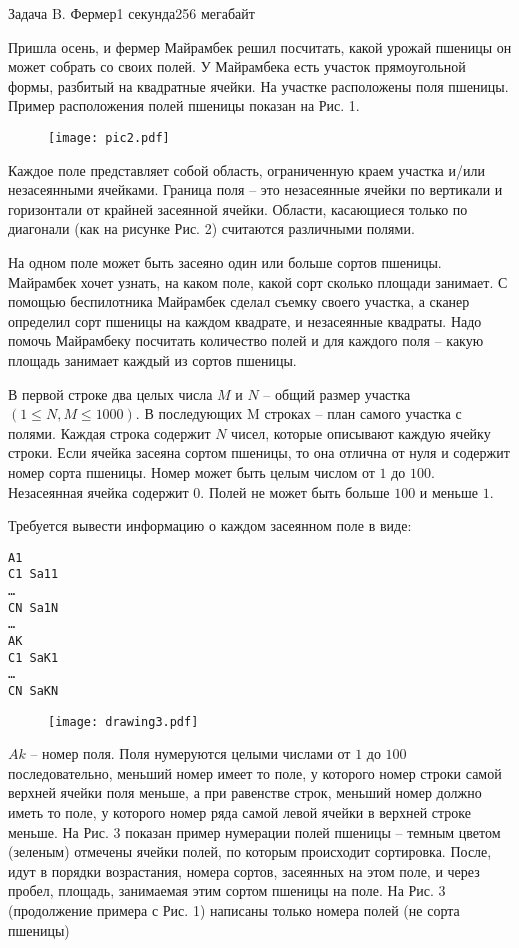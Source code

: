 \documentclass[11pt,a4paper,oneside]{article}
\begin{document}
\begin{problem}{Задача B. Фермер}{1 секунда}{256 мегабайт}

Пришла осень, и фермер Майрамбек решил посчитать, какой урожай пшеницы он может собрать со своих полей. У Майрамбека есть участок прямоугольной формы, разбитый на квадратные ячейки. На участке расположены  поля пшеницы. Пример расположения полей пшеницы показан на Рис. 1. 


\begin{figure}[ht]
\centering
\texttt{[image: pic2.pdf]}
\end{figure}


Каждое поле представляет собой область, ограниченную краем участка и/или незасеянными ячейками. Граница поля – это незасеянные ячейки по вертикали и  горизонтали от крайней засеянной ячейки. Области, касающиеся только по диагонали (как на рисунке Рис. 2) считаются различными полями.  


На одном поле может быть  засеяно один или больше сортов пшеницы. Майрамбек хочет узнать, на каком поле, какой сорт сколько площади занимает. С помощью беспилотника Майрамбек сделал съемку своего участка, а сканер определил сорт пшеницы на каждом квадрате, и незасеянные квадраты.  Надо помочь Майрамбеку посчитать количество полей и для каждого поля – какую площадь занимает каждый из сортов пшеницы.

\InputFile
В первой строке два целых числа $M$ и $N$ – общий размер участка $(1 \leq N,M \leq 1000)$. В последующих M строках – план самого участка с полями. Каждая строка содержит $N$ чисел, которые описывают каждую ячейку строки. Если ячейка засеяна сортом пшеницы, то она отлична от нуля и содержит номер сорта пшеницы. Номер может быть целым числом от $1$ до $100$. Незасеянная ячейка содержит $0$. Полей не может быть больше $100$ и меньше $1$.



\OutputFile
Требуется вывести информацию о каждом засеянном поле в виде:

\begin{verbatim}
A1
C1 Sa11
…
CN Sa1N
…
AK
C1 SaK1
…
CN SaKN
\end{verbatim}




\begin{figure}[ht]
\centering
\texttt{[image: drawing3.pdf]}
\end{figure}

$Ak$ – номер поля. Поля нумеруются целыми числами от $1$ до $100$ последовательно, меньший номер имеет то поле, у которого номер строки самой верхней ячейки поля меньше, а при равенстве строк, меньший номер должно иметь то поле, у которого номер ряда самой левой ячейки в верхней строке меньше. На Рис. 3 показан пример нумерации полей пшеницы – темным цветом (зеленым) отмечены ячейки полей, по которым происходит сортировка. После, идут в порядки возрастания, номера сортов, засеянных на этом поле, и через пробел, площадь, занимаемая этим сортом пшеницы на поле.
На Рис. 3 (продолжение примера с Рис. 1) написаны только номера полей (не сорта пшеницы)



\end{problem}
\end{document}
